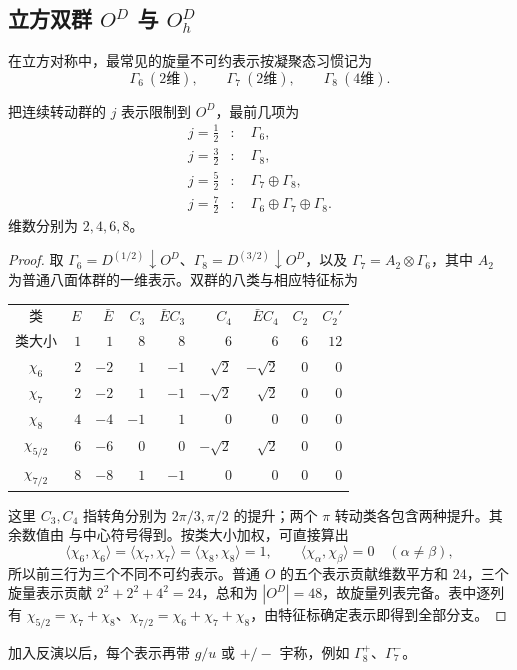 \subsection{\texorpdfstring{立方双群 $O^D$ 与 $O_h^D$}{立方双群 OD 与 OhD}}

在立方对称中，最常见的旋量不可约表示按凝聚态习惯记为
\[
\Gamma_6\ (2\text{维}),
\qquad
\Gamma_7\ (2\text{维}),
\qquad
\Gamma_8\ (4\text{维}).
\]
\begin{proposition}[立方双群的低自旋分支]
把连续转动群的 $j$ 表示限制到 $O^D$，最前几项为
\begin{align*}
j=\frac12&:\quad \Gamma_6,\\
j=\frac32&:\quad \Gamma_8,\\
j=\frac52&:\quad \Gamma_7\oplus\Gamma_8,\\
j=\frac72&:\quad \Gamma_6\oplus\Gamma_7\oplus\Gamma_8.
\end{align*}
维数分别为 $2,4,6,8$。
\end{proposition}
\begin{proof}
取 $\Gamma_6=D^{(1/2)}\downarrow O^D$、$\Gamma_8=D^{(3/2)}\downarrow O^D$，以及 $\Gamma_7=A_2\otimes\Gamma_6$，其中 $A_2$ 为普通八面体群的一维表示。双群的八类与相应特征标为
\begin{center}
\small
\begin{tabular}{c|rrrrrrrr}
\toprule
类 & $E$ & $\bar E$ & $C_3$ & $\bar E C_3$ & $C_4$ & $\bar E C_4$ & $C_2$ & $C_2'$\\
类大小 & $1$ & $1$ & $8$ & $8$ & $6$ & $6$ & $6$ & $12$\\
\midrule
$\chi_6$ & $2$ & $-2$ & $1$ & $-1$ & $\sqrt2$ & $-\sqrt2$ & $0$ & $0$\\
$\chi_7$ & $2$ & $-2$ & $1$ & $-1$ & $-\sqrt2$ & $\sqrt2$ & $0$ & $0$\\
$\chi_8$ & $4$ & $-4$ & $-1$ & $1$ & $0$ & $0$ & $0$ & $0$\\
$\chi_{5/2}$ & $6$ & $-6$ & $0$ & $0$ & $-\sqrt2$ & $\sqrt2$ & $0$ & $0$\\
$\chi_{7/2}$ & $8$ & $-8$ & $1$ & $-1$ & $0$ & $0$ & $0$ & $0$\\
\bottomrule
\end{tabular}
\end{center}
这里 $C_3,C_4$ 指转角分别为 $2\pi/3,\pi/2$ 的提升；两个 $\pi$ 转动类各包含两种提升。其余数值由  与中心符号得到。按类大小加权，可直接算出
\[
\langle\chi_6,\chi_6\rangle
=\langle\chi_7,\chi_7\rangle
=\langle\chi_8,\chi_8\rangle=1,
\qquad \langle\chi_\alpha,\chi_\beta\rangle=0\quad(\alpha\ne\beta),
\]
所以前三行为三个不同不可约表示。普通 $O$ 的五个表示贡献维数平方和 $24$，三个旋量表示贡献 $2^2+2^2+4^2=24$，总和为 $|O^D|=48$，故旋量列表完备。表中逐列有 $\chi_{5/2}=\chi_7+\chi_8$、$\chi_{7/2}=\chi_6+\chi_7+\chi_8$，由特征标确定表示即得到全部分支。
\end{proof}
加入反演以后，每个表示再带 $g/u$ 或 $+/-$ 宇称，例如 $\Gamma_8^+$、$\Gamma_7^-$。

